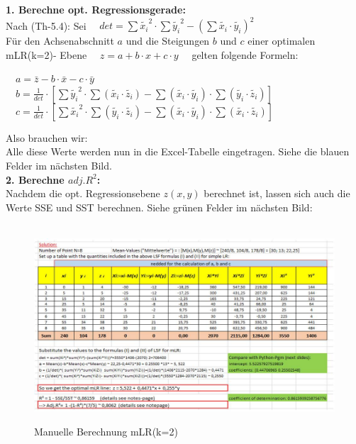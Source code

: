 \documentclass[12pt]{article}
\begin{document}
\textbf{1. Berechne opt. Regressionsgerade:}\\[0.2cm]   
Nach (Th-5.4): Sei $ \quad det = \sum{\widetilde{x_i}^2} \cdot \sum{\widetilde{y_i}^2}  -  (\sum{\widetilde{x_i} \cdot \widetilde{y_i}})^2 \quad $ \\
Für den Achsenabschnitt $a$ und die Steigungen $b$ und $c$ einer optimalen mLR(k=2)- Ebene $\quad  z = a +  b \cdot x + c \cdot y \quad $  
gelten folgende Formeln:\\[0.4cm]
\begin{large}
$ \quad a = \bar{z} - b \cdot \bar{x} - c \cdot \bar{y} \ \qquad \qquad \qquad\qquad $ \\[0.3cm]
$ \quad b = \frac{1}{det} \cdot \left[  \sum{\widetilde{y_i}^2} \cdot  \sum{(\widetilde{x_i} \cdot \widetilde{z_i})} - \sum{(\widetilde{x_i} \cdot \widetilde{y_i})} \cdot  \sum{(\widetilde{y_i} \cdot \widetilde{z_i})}          \right] $    \\[0.3cm]                                
$ \quad c = \frac{1}{det} \cdot \left[ \sum{\widetilde{x_i}^2} \cdot  \sum{(\widetilde{y_i} \cdot \widetilde{z_i})} - \sum{(\widetilde{x_i} \cdot \widetilde{y_i})} \cdot  \sum{( \widetilde{x_i} \cdot \widetilde{z_i})}          \right] $ \\[0.5cm]
\end{large}
Also brauchen wir: {}
\\[0.2cm]
Alle diese Werte werden nun in die Excel-Tabelle eingetragen. Siehe die blauen Felder im nächsten Bild.\\[0.1cm]

\textbf{2. Berechne $adj.R^2$:}\\[0.2cm]
Nachdem die opt. Regressionsebene $z(x,y)$ berechnet ist, lassen sich auch die  Werte SSE und SST berechnen. Siehe grünen Felder im nächsten Bild:\\
\\[0.5cm]

\begin{figure}[htp]
  \centering
  \hspace*{-0.8cm} 
  \includegraphics[width=1.2\textwidth]{Einfaches-mLR(k=2)_Beispiel}\\
  \caption{Manuelle Berechnung mLR(k=2)}
  \label{fig:mLR(k=2)-Beispiel}
\end{figure}
\newpage
\end{document}
